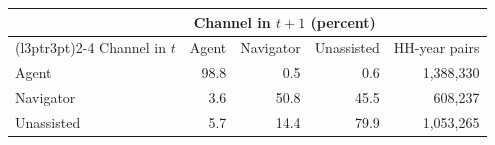 
\begin{tabular}{lrrrr}
\toprule
\multicolumn{1}{c}{ } & \multicolumn{3}{c}{Channel in $t+1$ (percent)} & \multicolumn{1}{c}{ } \\
\cmidrule(l{3pt}r{3pt}){2-4}
Channel in $t$ & Agent & Navigator & Unassisted & HH-year pairs\\
\midrule
Agent & 98.8 & 0.5 & 0.6 & 1,388,330\\
Navigator & 3.6 & 50.8 & 45.5 & 608,237\\
Unassisted & 5.7 & 14.4 & 79.9 & 1,053,265\\
\bottomrule
\end{tabular}
